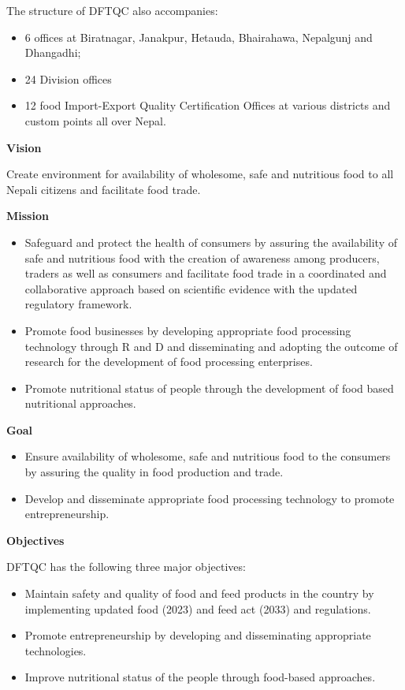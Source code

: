 \documentclass[
  openany]{book}
\providecommand{\tightlist}{%
  \setlength{\itemsep}{0pt}\setlength{\parskip}{0pt}}
\begin{document}
The structure of DFTQC also accompanies:

\begin{itemize}
\tightlist
\item
  6 offices at Biratnagar, Janakpur, Hetauda, Bhairahawa, Nepalgunj and Dhangadhi;
\item
  24 Division offices
\item
  12 food Import-Export Quality Certification Offices at various districts and custom points all over Nepal.
\end{itemize}

\textbf{Vision}

Create environment for availability of wholesome, safe and nutritious food to all Nepali citizens and facilitate food trade.

\textbf{Mission}

\begin{itemize}
\tightlist
\item
  Safeguard and protect the health of consumers by assuring the availability of safe and nutritious food with the creation of awareness among producers, traders as well as consumers and facilitate food trade in a coordinated and collaborative approach based on scientific evidence with the updated regulatory framework.
\item
  Promote food businesses by developing appropriate food processing technology through R and D and disseminating and adopting the outcome of research for the development of food processing enterprises.
\item
  Promote nutritional status of people through the development of food based nutritional approaches.
\end{itemize}

\textbf{Goal}

\begin{itemize}
\tightlist
\item
  Ensure availability of wholesome, safe and nutritious food to the consumers by assuring the quality in food production and trade.
\item
  Develop and disseminate appropriate food processing technology to promote entrepreneurship.
\end{itemize}

\textbf{Objectives}

DFTQC has the following three major objectives:

\begin{itemize}
\tightlist
\item
  Maintain safety and quality of food and feed products in the country by implementing updated food (2023) and feed act (2033) and regulations.
\item
  Promote entrepreneurship by developing and disseminating appropriate technologies.
\item
  Improve nutritional status of the people through food-based approaches.
\end{itemize}
\end{document}
